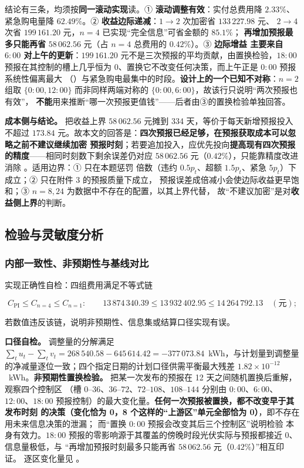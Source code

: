 结论有三条，均须按\textbf{同一滚动实现}读。① \textbf{滚动调整有效}：实付总费用降 \(2.33\%\)、
紧急购电量降 \(62.49\%\)。② \textbf{收益边际递减}：\(1\to2\) 次加密省 \(133\,227.98\) 元、
\(2\to4\) 次省 \(199\,161.20\) 元，\(n=4\) 已实现“完全信息”可省金额的 \(\mathbf{85.1\%}\)；
\textbf{再增加预报最多只能再省} \(58\,062.56\) 元（占 \(n=4\) 总费用的 \(0.42\%\)）。③ \textbf{边际增益
主要来自 \(6{:}00\) 对上午的更新}：\(199\,161.20\) 元不是三次预报的平均贡献，由置换检验，\(18{:}00\)
预报在其控制的槽上几乎恒为 0、置换它不改变任何决策，而上午正是 \(0{:}00\) 预报系统性偏离最大
（）与紧急购电最集中的时段。\textbf{设计上的一个已知不对称}：\(n=2\) 组取
\(\{0{:}00,12{:}00\}\) 而非同样两端对称的 \(\{0{:}00,6{:}00\}\)，故该行只说明“两次预报也有效”，
\textbf{不能}用来推断“哪一次预报更值钱”——后者由③的置换检验单独回答。

\textbf{成本侧与结论。} 把收益上界 \(58\,062.56\) 元摊到 334 天，等价于每天新增预报投入不超过
\(173.84\) 元。故本文的回答是：\textbf{四次预报已经足够，在预报获取成本可以忽略之前不建议继续加密
预报时刻}；若要追加投入，应优先投向\textbf{提高现有四次预报的精度}——相同时刻数下剩余误差仍对应
\(58\,062.56\) 元（\(0.42\%\)），只能靠精度改进消除 。适用边界：① 只在本题惩罚
倍数（违约 \(0.5p_t\)、超额 \(1.5p_t\)、紧急 \(5p_t\)）下成立；② 只在附件 3 的预报质量下成立，
预报误差成倍减小会使边际收益更早饱和；③ \(n=8,24\) 为数据中不存在的配置，以其上界代替，
故“不建议加密”是对\textbf{收益侧上界}的判断。

\subsection{检验与灵敏度分析}

\subsubsection{内部一致性、非预期性与基线对比}
实现正确性自检：四组费用满足不等式链

\begin{equation}
  C_{\mathrm{PI}}\le C_{n=4}\le C_{n=1}:\qquad
  13\,874\,340.39\le13\,932\,402.95\le14\,264\,792.13\quad(\text{元});
  \label{eq:q3-chain}
\end{equation}

若数值违反该链，说明非预期性、信息集或结算口径实现有误。

\textbf{口径自检。} 调整量的分解满足 \(\sum_tu_t-\sum_tv_t=268\,540.58-645\,614.42
=-377\,073.84\)~kWh，与计划量到调整量的净减量逐位一致；四个指定日期的计划口径供需平衡最大残差
\(1.82\times10^{-12}\)~kWh。\textbf{非预期性置换检验。} 把某一次发布的预报在 12 天之间随机置换后重解，观察四个控制区
（槽 \(0\)--\(36\)、\(36\)--\(72\)、\(72\)--\(108\)、\(108\)--\(144\) 分别由 \(0{:}00\)、\(6{:}00\)、
\(12{:}00\)、\(18{:}00\) 预报控制）的最大变化量。\textbf{任何一次预报被置换，都不改变早于其发布时刻
的决策（变化恰为 0，8 个这样的“上游区”单元全部恰为 0）}，即不存在用未来信息决策的泄漏；
而“置换 \(0{:}00\) 预报会改变其后三个控制区”说明检验
本身有效力。\(18{:}00\) 预报的零影响源于其覆盖的傍晚时段光伏实际与预报都接近 0、信息量极低，与
“再增加预报时刻最多只能再省 \(58\,062.56\) 元（\(0.42\%\)）”相互印证。
逐区变化量见 。

